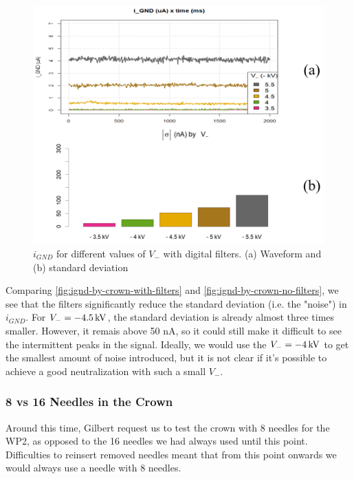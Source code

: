 \documentclass[oneside,12pt]{article}
\begin{document}
\begin{figure}[h!]
    \centering
    \includegraphics[width=1\textwidth,trim=1 1 1 1,clip]{figures/ignd-by-crown-with-filters.png}
    \caption{$i_{GND}$ for different values of $V_-$ with digital filters. (a) Waveform and (b) standard deviation}
    \label{fig:ignd-by-crown-with-filters}
\end{figure}

Comparing \autoref{fig:ignd-by-crown-with-filters} and \autoref{fig:ignd-by-crown-no-filters}, we see that the filters significantly 
reduce the standard deviation (i.e. the "noise") in $i_{GND}$. For $V_- = - 4.5 \,\mathrm{kV}$, the standard deviation is already almost 
three times smaller. However, it remais above 50 nA, so it could still make it difficult to see the intermittent peaks in the signal.
Ideally, we would use the $V_- = - 4 \,\mathrm{kV}$ to get the smallest amount of noise introduced, but it is not clear if it's possible
to achieve a good neutralization with such a small $V_-$.

\subsubsection{8 vs 16 Needles in the Crown}

Around this time, Gilbert request us to test the crown with 8 needles for the WP2, as opposed to the 16 needles we had always used until 
this point. Difficulties to reinsert removed needles meant that from this point onwards we would always use a needle with 8 needles. 
\end{document}
